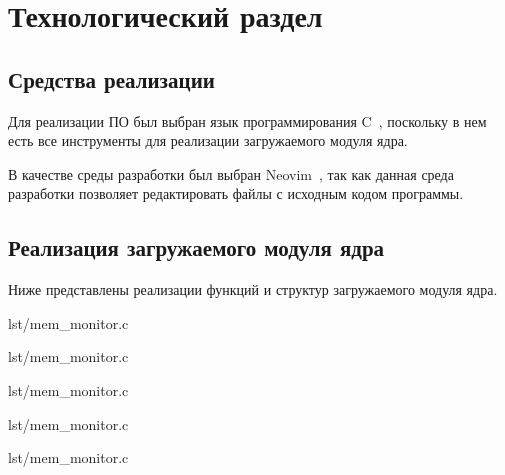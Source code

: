 \section{Технологический раздел}

\subsection{Средства реализации}

Для реализации ПО был выбран язык программирования C~\cite{c}, поскольку в нем есть все инструменты для реализации загружаемого модуля ядра.

В качестве среды разработки был выбран Neovim~\cite{neovim}, так как данная среда разработки позволяет редактировать файлы с исходным кодом программы.

\subsection{Реализация загружаемого модуля ядра}

Ниже представлены реализации функций и структур загружаемого модуля ядра.

\begin{lstinputlisting}[
        label={lst:},
        caption={Структура struct mem\_alloc\_entry для логирования информации},
        firstline=23,
        lastline=31,
    ]{lst/mem_monitor.c}
\end{lstinputlisting}

\begin{lstinputlisting}[
        label={lst:},
        caption={Функция pre\_kmalloc\_handler},
        firstline=48,
        lastline=74,
    ]{lst/mem_monitor.c}
\end{lstinputlisting}

\begin{lstinputlisting}[
        label={lst:},
        caption={Функция pre\_kmem\_cache\_alloc\_handler},
        firstline=160,
        lastline=202,
    ]{lst/mem_monitor.c}
\end{lstinputlisting}

\begin{lstinputlisting}[
        label={lst:},
        caption={Проба kp\_kmalloc},
        firstline=204,
        lastline=207,
    ]{lst/mem_monitor.c}
\end{lstinputlisting}

\begin{lstinputlisting}[
        label={lst:},
        caption={Проба kp\_kmem\_cache\_alloc},
        firstline=224,
        lastline=227,
    ]{lst/mem_monitor.c}
\end{lstinputlisting}

